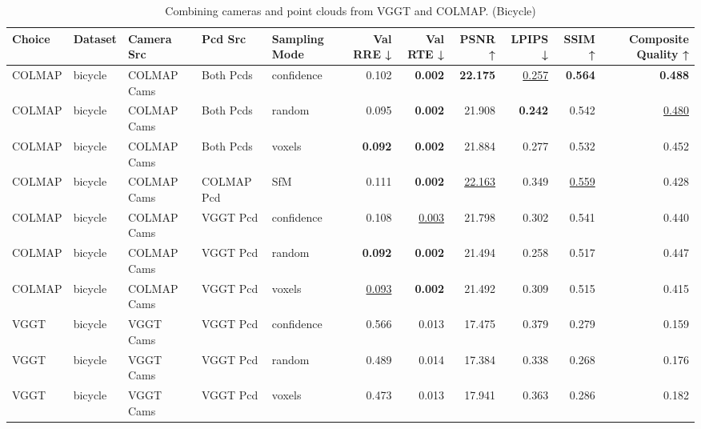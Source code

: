 \begin{table}[H]
\caption{\ifdefined\customcaption \customcaption \else Combining cameras and point clouds from VGGT and COLMAP. (Bicycle) \fi}
\label{tab:07_combined_single_bicycle}
\centering
\tiny
\begin{tabular}{lllllrrrrrr}
\toprule
Choice & Dataset & Camera Src & Pcd Src & Sampling Mode & Val RRE ↓ & Val RTE ↓ & PSNR ↑ & LPIPS ↓ & SSIM ↑ & Composite Quality ↑ \\
\midrule
COLMAP & bicycle & COLMAP Cams & Both Pcds & confidence & 0.102 & \textbf{0.002} & \textbf{22.175} & \underline{0.257} & \textbf{0.564} & \textbf{0.488} \\
COLMAP & bicycle & COLMAP Cams & Both Pcds & random & 0.095 & \textbf{0.002} & 21.908 & \textbf{0.242} & 0.542 & \underline{0.480} \\
COLMAP & bicycle & COLMAP Cams & Both Pcds & voxels & \textbf{0.092} & \textbf{0.002} & 21.884 & 0.277 & 0.532 & 0.452 \\
COLMAP & bicycle & COLMAP Cams & COLMAP Pcd & SfM & 0.111 & \textbf{0.002} & \underline{22.163} & 0.349 & \underline{0.559} & 0.428 \\
COLMAP & bicycle & COLMAP Cams & VGGT Pcd & confidence & 0.108 & \underline{0.003} & 21.798 & 0.302 & 0.541 & 0.440 \\
COLMAP & bicycle & COLMAP Cams & VGGT Pcd & random & \textbf{0.092} & \textbf{0.002} & 21.494 & 0.258 & 0.517 & 0.447 \\
COLMAP & bicycle & COLMAP Cams & VGGT Pcd & voxels & \underline{0.093} & \textbf{0.002} & 21.492 & 0.309 & 0.515 & 0.415 \\
VGGT & bicycle & VGGT Cams & VGGT Pcd & confidence & 0.566 & 0.013 & 17.475 & 0.379 & 0.279 & 0.159 \\
VGGT & bicycle & VGGT Cams & VGGT Pcd & random & 0.489 & 0.014 & 17.384 & 0.338 & 0.268 & 0.176 \\
VGGT & bicycle & VGGT Cams & VGGT Pcd & voxels & 0.473 & 0.013 & 17.941 & 0.363 & 0.286 & 0.182 \\
\bottomrule
\end{tabular}
\end{table}